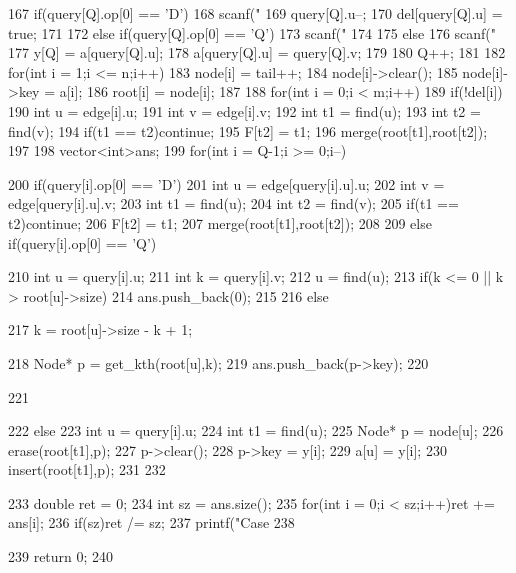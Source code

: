 \documentclass[11pt]{article}
\begin{document}
\begin{Code}
{{{167                  if(query[Q].op[0] == 'D'){
168                      scanf("%
169                      query[Q].u--;
170                      del[query[Q].u] = true;
171                  }
172                  else if(query[Q].op[0] == 'Q'){
173                      scanf("%
174                  }
175                  else{
176                      scanf("%
177                      y[Q] = a[query[Q].u];
178                      a[query[Q].u] = query[Q].v;
179                  }
180                  Q++;
181              }
182              for(int i = 1;i <= n;i++){
183                  node[i] = tail++;
184                  node[i]->clear();
185                  node[i]->key = a[i];
186                  root[i] = node[i];
187              }
188              for(int i = 0;i < m;i++)
189                  if(!del[i]){
190                      int u = edge[i].u;
191                      int v = edge[i].v;
192                      int t1 = find(u);
193                      int t2 = find(v);
194                      if(t1 == t2)continue;
195                      F[t2] = t1;
196                      merge(root[t1],root[t2]);
197                  }
198              vector<int>ans;
199              for(int i = Q-1;i >= 0;i--){
200                  if(query[i].op[0] == 'D'){
201                      int u = edge[query[i].u].u;
202                      int v = edge[query[i].u].v;
203                      int t1 = find(u);
204                      int t2 = find(v);
205                      if(t1 == t2)continue;
206                      F[t2] = t1;
207                      merge(root[t1],root[t2]);
208                  }
209                  else if(query[i].op[0] == 'Q'){
210                      int u = query[i].u;
211                      int k = query[i].v;
212                      u = find(u);
213                      if(k <= 0 || k > root[u]->size){
214                          ans.push_back(0);
215                      }
216                      else{
217                          k = root[u]->size - k + 1;


218                         Node* p = get_kth(root[u],k);
219                         ans.push_back(p->key);
220                     }
221                 }
222                 else{
223                     int u = query[i].u;
224                     int t1 = find(u);
225                     Node* p = node[u];
226                     erase(root[t1],p);
227                     p->clear();
228                     p->key = y[i];
229                     a[u] = y[i];
230                     insert(root[t1],p);
231                 }
232             }
233             double ret = 0;
234             int sz = ans.size();
235             for(int i = 0;i < sz;i++)ret += ans[i];
236             if(sz)ret /= sz;
237             printf("Case %
238        }
239        return 0;
240 }
\end{Code}
\end{document}

